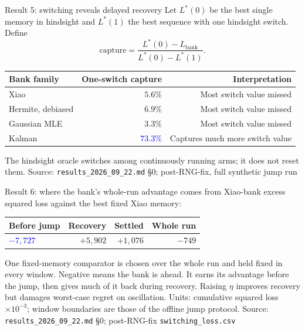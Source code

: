 \documentclass[aspectratio=169,11pt]{beamer}
\newcommand{\good}[1]{\textcolor{blue}{\textbf{#1}}}
\newcommand{\caution}[1]{\textcolor{rust}{\textbf{#1}}}
\newcommand{\src}[1]{\vfill{\tiny\color{gray}Source: #1}}
\begin{document}
\begin{frame}{Result 5: switching reveals delayed recovery}
  Let $L^*(0)$ be the best single memory in hindsight and $L^*(1)$ the best
  sequence with one hindsight switch. Define
  \[
    \mathrm{capture}=
    \frac{L^*(0)-L_{\mathrm{bank}}}{L^*(0)-L^*(1)}.
  \]
  \begin{center}
  \begin{tabular}{lrr}
    \toprule
    Bank family & One-switch capture & Interpretation\\
    \midrule
    Xiao & $5.6\%$ & Most switch value missed\\
    Hermite, debiased & $6.9\%$ & Most switch value missed\\
    Gaussian MLE & $3.3\%$ & Most switch value missed\\
    Kalman & \good{$73.3\%$} & Captures much more switch value\\
    \bottomrule
  \end{tabular}
  \end{center}
  The hindsight oracle switches among continuously running arms; it does not reset them.
  \src{\texttt{results\_2026\_09\_22.md} \S0; post-RNG-fix, full synthetic jump run}
\end{frame}

\begin{frame}{Result 6: where the bank's whole-run advantage comes from}
  Xiao-bank excess squared loss against the best fixed Xiao memory:
  \begin{center}
  \begin{tabular}{lrrr}
    \toprule
    Before jump & Recovery & Settled & Whole run\\
    \midrule
    \good{$-7{,}727$} & \caution{$+5{,}902$} & $+1{,}076$ & $-749$\\
    \bottomrule
  \end{tabular}
  \end{center}
  \medskip
  \small One fixed-memory comparator is chosen over the whole run and held fixed in
  every window. Negative means the bank is ahead. It earns its advantage before the jump,
  then gives much of it back during recovery. Raising $\eta$ improves recovery
  but damages worst-case regret on oscillation.
  \medskip
  \small Units: cumulative squared loss $\times10^{-3}$; window boundaries are
  those of the offline jump protocol.
  \src{\texttt{results\_2026\_09\_22.md} \S0; post-RNG-fix \texttt{switching\_loss.csv}}
\end{frame}
\end{document}
